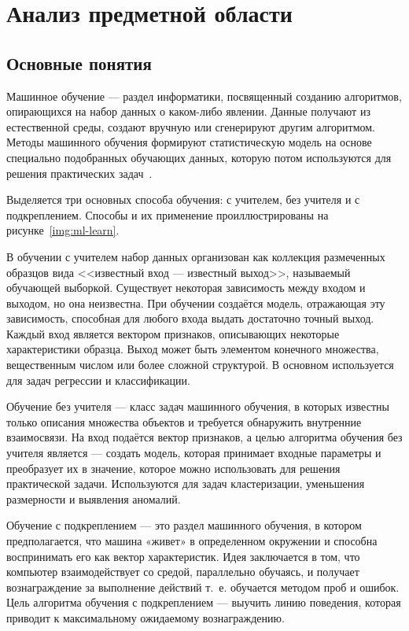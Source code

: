 \chapter{Анализ предметной области}

\section{Основные понятия}
Машинное обучение --- раздел информатики, посвященный созданию алгоритмов, опирающихся на набор данных о каком-либо явлении. Данные получают из естественной среды, создают вручную или сгенерируют другим алгоритмом. Методы машинного обучения формируют статистическую модель на основе специально подобранных обучающих данных, которую потом используются для решения практических задач~\cite{ML_no_wors}.

Выделяется три основных способа обучения: с учителем, без учителя и с подкреплением. Способы и их применение проиллюстрированы на рисунке~\ref{img:ml-learn}.


В обучении с учителем набор данных организован как коллекция размеченных образцов вида <<известный вход --- известный выход>>, называемый обучающей выборкой. Существует некоторая зависимость между входом и выходом, но она неизвестна. При обучении создаётся модель, отражающая эту зависимость, способная для любого входа выдать достаточно точный выход. Каждый вход является вектором признаков, описывающих некоторые характеристики образца. Выход может быть элементом конечного множества, вещественным числом или более сложной структурой. В основном используется для задач регрессии и классификации.

Обучение без учителя --- класс задач машинного обучения, в которых известны только описания множества объектов и требуется обнаружить внутренние взаимосвязи. На вход подаётся вектор признаков, а целью алгоритма обучения без учителя является --- создать модель, которая принимает входные параметры и преобразует их в значение, которое можно использовать для решения практической задачи. Используются для задач кластеризации, уменьшения размерности и выявления аномалий.

Обучение с подкреплением --- это раздел машинного обучения, в котором предполагается, что машина «живет» в определенном окружении и способна воспринимать его как вектор характеристик. Идея заключается в том, что компьютер взаимодействует со средой, параллельно обучаясь, и получает вознаграждение за выполнение действий т.~е. обучается методом проб и ошибок. Цель алгоритма обучения с подкреплением — выучить линию поведения, которая приводит к максимальному ожидаемому вознаграждению.


